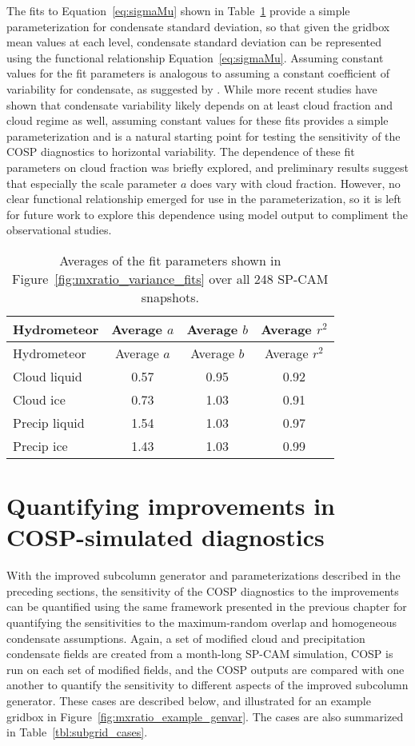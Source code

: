 The fits to Equation~\ref{eq:sigmaMu} shown in
Table~\ref{tbl:mxratio_variance_fits_table} provide a simple
parameterization for condensate standard deviation, so that given the
gridbox mean values at each level, condensate standard deviation can be
represented using the functional relationship Equation~\ref{eq:sigmaMu}.
Assuming constant values for the fit parameters is analogous to assuming
a constant coefficient of variability for condensate, as suggested by
\citet{shonk_et_al_2010}. While more recent studies have shown that
condensate variability likely depends on at least cloud fraction and
cloud regime as well, assuming constant values for these fits provides a
simple parameterization and is a natural starting point for testing the
sensitivity of the COSP diagnostics to horizontal variability. The
dependence of these fit parameters on cloud fraction was briefly
explored, and preliminary results suggest that especially the scale
parameter \(a\) does vary with cloud fraction. However, no clear
functional relationship emerged for use in the parameterization, so it
is left for future work to explore this dependence using model output to
compliment the observational studies.

\begin{longtable}[]{@{}lccc@{}}
\caption{\label{tbl:mxratio_variance_fits_table}Averages of the fit
parameters shown in Figure~\ref{fig:mxratio_variance_fits} over all 248
SP-CAM snapshots. }\tabularnewline
\toprule
Hydrometeor & Average \(a\) & Average \(b\) & Average
\(r^2\)\tabularnewline
\midrule
\endfirsthead
\toprule
Hydrometeor & Average \(a\) & Average \(b\) & Average
\(r^2\)\tabularnewline
\midrule
\endhead
Cloud liquid & 0.57 & 0.95 & 0.92\tabularnewline
Cloud ice & 0.73 & 1.03 & 0.91\tabularnewline
Precip liquid & 1.54 & 1.03 & 0.97\tabularnewline
Precip ice & 1.43 & 1.03 & 0.99\tabularnewline
\bottomrule
\end{longtable}

\section{Quantifying improvements in COSP-simulated
diagnostics}\label{sec:subgrid2Results}

With the improved subcolumn generator and parameterizations described in
the preceding sections, the sensitivity of the COSP diagnostics to the
improvements can be quantified using the same framework presented in the
previous chapter for quantifying the sensitivities to the maximum-random
overlap and homogeneous condensate assumptions. Again, a set of modified
cloud and precipitation condensate fields are created from a month-long
SP-CAM simulation, COSP is run on each set of modified fields, and the
COSP outputs are compared with one another to quantify the sensitivity
to different aspects of the improved subcolumn generator. These cases
are described below, and illustrated for an example gridbox in
Figure~\ref{fig:mxratio_example_genvar}. The cases are also summarized
in Table~\ref{tbl:subgrid_cases}.

